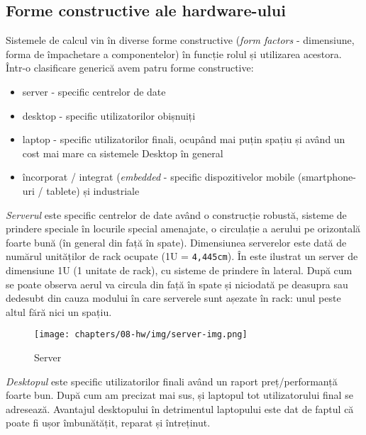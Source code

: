 \subsection{Forme constructive ale hardware-ului}
\label{sec:hw:class:form}

Sistemele de calcul vin în diverse forme constructive (\textit{form factors}
		- dimensiune, forma de împachetare a componentelor) în funcție
		rolul și utilizarea acestora. Într-o clasificare generică avem
		patru forme constructive:
\begin{itemize}
	\item server - specific centrelor de date
	\item desktop - specific utilizatorilor obișnuiți
	\item laptop - specific utilizatorilor finali, ocupând mai puțin spațiu
		și având un cost mai mare ca sistemele Desktop în general
        \item încorporat / integrat (\textit{embedded} - specific dispozitivelor mobile (smartphone-uri /
		tablete) și industriale
\end{itemize}

\textit{Serverul} este specific centrelor de date având o construcție robustă,
sisteme de prindere speciale în locurile special amenajate, o circulație a
aerului pe orizontală foarte bună (în general din față în spate). Dimensiunea
serverelor este dată de numărul unităților de rack ocupate (1U = \texttt{4,445cm}). În
 este ilustrat un server de dimensiune 1U
(1 unitate de rack), cu sisteme de prindere în lateral. După cum se poate
observa aerul va circula din față în spate și niciodată pe deasupra sau dedesubt
din cauza modului în care serverele sunt așezate în rack: unul peste altul fără
nici un spațiu.

\begin{figure}[!htbp]
	\centering
	\texttt{[image: chapters/08-hw/img/server-img.png]}
	\caption{Server\protect\footnotemark}
	\label{fig:hw:server}
\end{figure}


\textit{Desktopul} este specific utilizatorilor finali având un raport
preț/performanță foarte bun. După cum am precizat mai sus, și laptopul tot
utilizatorului final se adresează. Avantajul desktopului în detrimentul
laptopului este dat de faptul că poate fi ușor îmbunătățit, reparat și
întreținut.

